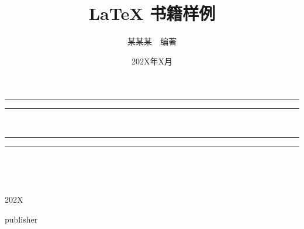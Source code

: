 \documentclass[openany,twoside,12pt]{book}
\title{\bfseries LaTeX 书籍样例}
\author{\fangsong 某某某~~编著}
\date{\fangsong 202X年X月}
\theoremstyle{plain}
\newcommand{\plogo}{\fbox{$\mathcal{PL}$}}
\begin{document}


\begin{titlepage}
    \centering   %
    \scshape     %
    \vspace*{2\baselineskip}   %

	
    \rule{\textwidth}{1.6pt}\vspace*{-\baselineskip}\vspace*{2pt}  %
    \rule{\textwidth}{0.4pt}   %
	
    \vspace{0.75\baselineskip} %

    \makeatletter
    {\LARGE\bfseries \@title \\} %

	\vspace{0.75\baselineskip} %
	
	\rule{\textwidth}{0.4pt}\vspace*{-\baselineskip}\vspace{3.2pt} %
	\rule{\textwidth}{1.6pt}  %
	
	\vspace{2\baselineskip}   %
	
	
    {\fangsong\large \@author \\[10pt] }
	
    {\fangsong\large \@date \\}

    \makeatother


	
	\vfill %
	
	
	\plogo %
	
	\vspace{0.3\baselineskip} %
	
	202X %

	{\large publisher} %
\end{titlepage}
\end{document}
